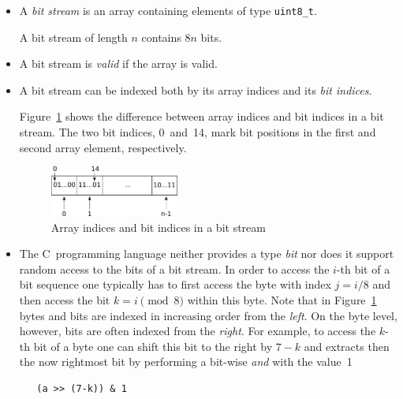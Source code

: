 

\begin{itemize}
\item
A \emph{bit stream} is an array containing elements of type \verb"uint8_t".

A bit stream of length $n$ contains $8n$ bits.

\item
A bit stream is \emph{valid} if the array is valid.

\item 
A bit stream can be indexed both by its array indices
and its \emph{bit indices}.

Figure~\ref{fig:bitstream-indices} shows the difference between 
array indices and bit indices in a bit stream.
The two bit indices, 0~and~14,
mark bit positions in the first and second array element, respectively.

\begin{figure}[hbt]
\begin{center}
\includegraphics[width=0.40\textwidth]{figures/array_as_stream.pdf}
\caption{\label{fig:bitstream-indices} Array indices and bit indices in a bit stream}
\end{center}
\end{figure}

\item 
The C~programming language neither provides a type \emph{bit}
nor does it support random access to the bits of a bit stream.
In order to access the $i$-th bit of a bit sequence one typically
has to first access the byte with index $j = i/8$ and then access the 
bit $k = i \pmod{8}$ within this byte.
Note that in Figure~\ref{fig:bitstream-indices} 
bytes and bits are indexed in increasing order from the \emph{left}.
On the byte level, however, bits are often indexed from the \emph{right}.
For example, to access the $k$-th bit of a byte  one can
shift this bit to the right by $7-k$ and extracts then the now
rightmost bit by performing a bit-wise \emph{and} with the value~1
%
\begin{verbatim}
   (a >> (7-k)) & 1
\end{verbatim}


\end{itemize}
